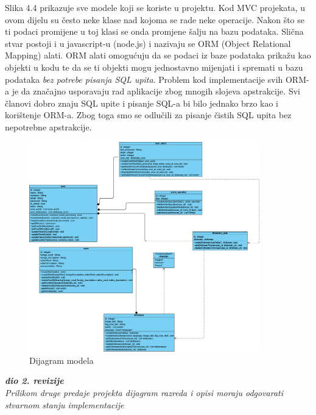 			\eject
            Slika 4.4 prikazuje sve modele koji se koriste u projektu. Kod MVC projekata, u ovom dijelu su često neke klase nad kojoma se rade neke operacije. Nakon što se ti podaci promijene u toj klasi se onda promjene šalju na bazu podataka.
            Slična stvar postoji i u javascript-u (node.js) i nazivaju se ORM (Object Relational Mapping) alati. ORM alati omogućuju da se podaci iz baze podataka prikažu kao objekti u kodu te da se ti objekti mogu jednostavno mijenjati i spremati u bazu podataka \textit{bez potrebe pisanja SQL upita}.
            Problem kod implementacije svih ORM-a je da značajno usporavaju rad aplikacije zbog mnogih slojeva apstrakcije. Svi članovi dobro znaju SQL upite i pisanje SQL-a bi bilo jednako brzo kao i korištenje ORM-a. Zbog toga smo se odlučili za pisanje čistih SQL upita bez nepotrebne apstrakcije.
				\begin{figure}[H]
					\includegraphics[width=0.9\textwidth]{dijagrami/slika3.jpg} 
					\centering
					\caption{Dijagram modela}
					\label{fig:class_diagram}
				\end{figure}			
			\eject
			
			\textbf{\textit{dio 2. revizije}}\\			
			
			\textit{Prilikom druge predaje projekta dijagram razreda i opisi moraju odgovarati stvarnom stanju implementacije}
			
